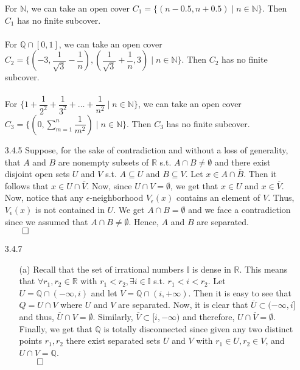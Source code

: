 \documentclass[11pt]{article}
\newcommand{\nats}{\mathbb{N}}
\newcommand{\reals}{\mathbb{R}}
\newcommand{\rats}{\mathbb{Q}}
\newcommand{\irrats}{\mathbb{I}}
\begin{document}
\begin{itemize}
        For $\nats$, we can take an open cover $C_1 = \{(n - 0.5, n + 0.5) \mid
        n \in \nats\}$. Then $C_1$ has no finite subcover.
        \\
        \\
        For $\rats \cap [0, 1]$, we can take an open cover $C_2 = \{(-3,
        \dfrac{1}{\sqrt{3}} - \dfrac{1}{n}), (\dfrac{1}{\sqrt{3}} +
        \dfrac{1}{n}, 3) \mid n \in \nats\}$. Then $C_2$ has no finite
        subcover.
        \\
        \\
        For $\{1 + \dfrac{1}{2^2} + \dfrac{1}{3^2} + \dots + \dfrac{1}{n^2}
        \mid n \in \nats\}$, we can take an open cover $C_3 = \{ (0, \sum_{m =
        1}^n \dfrac{1}{m^2}) \mid n \in \nats\}$. Then $C_3$ has no finite
        subcover.

    \item[3.4.5]
        Suppose, for the sake of contradiction and without a loss of
        generality, that $A$ and $B$ are nonempty subsets of $\reals$ s.t. $A
        \cap B \neq \emptyset$ and there exist disjoint open sets $U$ and $V$
        s.t. $A \subseteq U$ and $B \subseteq V$. Let $x \in A \cap
        \overline{B}$. Then it follows that $x \in U \cap \overline{V}$.  Now,
        since $U \cap V = \emptyset$, we get that $x \in U$ and $x \in
        \overline{V}$. Now, notice that any $\epsilon$-neighborhood
        $V_\epsilon(x)$ contains an element of $V$. Thus, $V_\epsilon(x)$ is
        not contained in $U$. We get $A \cap B = \emptyset$ and we face a
        contradiction since we assumed that $A \cap B \neq \emptyset$. Hence,
        $A$ and $B$ are separated.\\
        $\qed$

    \item[3.4.7]
        \begin{itemize}
            \item[(a)]
                Recall that the set of irrational numbers $\irrats$ is dense in
                $\reals$. This means that $\forall r_1, r_2 \in \reals$ with
                $r_1 < r_2, \exists i \in \irrats$ s.t. $r_1 < i < r_2$. Let $U
                = \rats \cap (-\infty, i)$ and let $V = \rats \cap (i,
                +\infty)$. Then it is easy to see that $Q = U \cap V$ where $U$
                and $V$ are separated. Now, it is clear that $\overline{U}
                \subset (-\infty, i]$ and thus, $\overline{U} \cap V =
                \emptyset$.  Similarly, $\overline{V} \subset [i, -\infty)$ and
                therefore, $U \cap \overline{V} = \emptyset$. Finally, we get
                that $\rats$ is totally disconnected since given any two
                distinct points $r_1, r_2$ there exist separated sets $U$ and
                $V$ with $r_1 \in U, r_2 \in V$, and $U \cap V = \rats$.\\
                $\qed$


\end{itemize}
\end{itemize}
\end{document}

